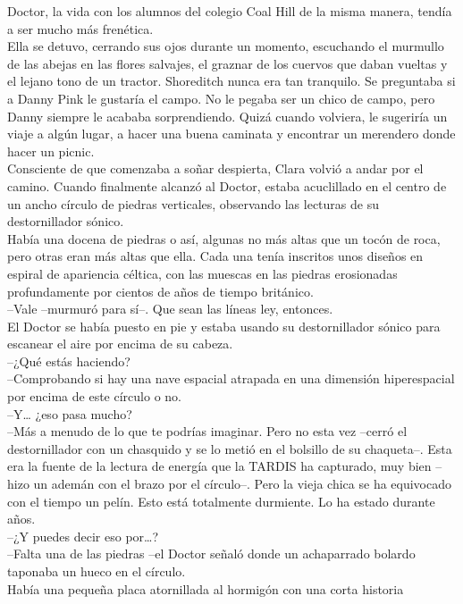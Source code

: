 Doctor, la vida con los alumnos del colegio Coal Hill de la misma
manera, tendía a ser mucho más frenética.\\
Ella se detuvo, cerrando sus ojos durante un momento, escuchando el
murmullo de las abejas en las flores salvajes, el graznar de los cuervos
que daban vueltas y el lejano tono de un tractor. Shoreditch nunca era
tan tranquilo. Se preguntaba si a Danny Pink le gustaría el campo. No le
pegaba ser un chico de campo, pero Danny siempre le acababa
sorprendiendo. Quizá cuando volviera, le sugeriría un viaje a algún
lugar, a hacer una buena caminata y encontrar un merendero donde hacer
un picnic.\\
Consciente de que comenzaba a soñar despierta, Clara volvió a andar por
el camino. Cuando finalmente alcanzó al Doctor, estaba acuclillado en el
centro de un ancho círculo de piedras verticales, observando las
lecturas de su destornillador sónico.\\
Había una docena de piedras o así, algunas no más altas que un tocón de
roca, pero otras eran más altas que ella. Cada una tenía inscritos unos
diseños en espiral de apariencia céltica, con las muescas en las piedras
erosionadas profundamente por cientos de años de tiempo británico.\\
--Vale --murmuró para sí--. Que sean las líneas ley, entonces.\\
El Doctor se había puesto en pie y estaba usando su destornillador
sónico para escanear el aire por encima de su cabeza.\\
--¿Qué estás haciendo?\\
--Comprobando si hay una nave espacial atrapada en una dimensión
hiperespacial por encima de este círculo o no.\\
--Y\ldots{} ¿eso pasa mucho?\\
--Más a menudo de lo que te podrías imaginar. Pero no esta vez --cerró
el destornillador con un chasquido y se lo metió en el bolsillo de su
chaqueta--. Esta era la fuente de la lectura de energía que la TARDIS ha
capturado, muy bien --hizo un ademán con el brazo por el círculo--. Pero
la vieja chica se ha equivocado con el tiempo un pelín. Esto está
totalmente durmiente. Lo ha estado durante años.\\
--¿Y puedes decir eso por\ldots{}?\\
--Falta una de las piedras --el Doctor señaló donde un achaparrado
bolardo taponaba un hueco en el círculo.\\
Había una pequeña placa atornillada al hormigón con una corta historia
